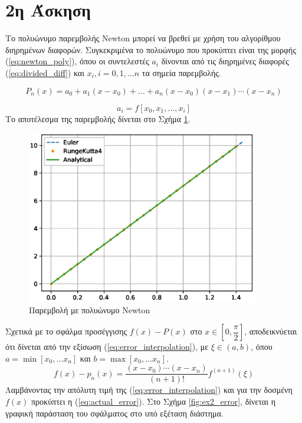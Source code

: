 \documentclass[assignment4.tex]{subfiles}
\begin{document}
\section*{2η Άσκηση}
Το πολυώνυμο παρεμβολής \textlatin{Newton} μπορεί να βρεθεί με χρήση του αλγορίθμου διηρημένων διαφορών. Συγκεκριμένα το πολυώνυμο που προκύπτει είναι της μορφής (\ref{eq:newton_poly}), όπου οι συντελεστές $a_i$ δίνονται από τις διηρημένες διαφορές (\ref{eq:divided_diff}) και $x_i,i=0,1,\dots n$ τα σημεία παρεμβολής. 

\begin{equation}
P_n(x) = a_0 + a_1(x-x_0) + \dots + a_n(x-x_0)(x-x_1)\cdots (x-x_n)
\label{eq:newton_poly}
\end{equation}

\begin{equation}
a_i = f[x_0, x_1, \dots, x_i]
\label{eq:divided_diff}
\end{equation}
Το αποτέλεσμα της παρεμβολής δίνεται στο Σχήμα \ref{fig:ex2}.
\begin{figure}[hp]
	\includegraphics[width=0.9\textwidth]{ex2a.eps}
	\centering
	\caption{Παρεμβολή με πολυώνυμο \textlatin{Newton}}
	\label{fig:ex2}
\end{figure}
Σχετικά με το σφάλμα προσέγγισης $f(x)-P(x)$ στο $x\in[0,\dfrac{\pi}{2}]$, αποδεικνύεται ότι δίνεται από την εξίσωση (\ref{eq:error_interpolation}), με $\xi\in (a, b)$, όπου $a=\min[x_0, \dots x_n]$ και $b=\max[x_0, \dots x_n]$.
\begin{equation}
f(x)-p_n(x)=\frac{(x-x_0)\cdots(x-x_n)}{(n+1)!}f^{(n+1)}(\xi)
\label{eq:error_interpolation}
\end{equation}
Λαμβάνοντας την απόλυτη τιμή της (\ref*{eq:error_interpolation}) και για την δοσμένη $f(x)$ προκύπτει η (\ref{eq:actual_error}). Στο Σχήμα \ref{fig:ex2_error}, δίνεται η γραφική παράσταση του σφάλματος στο υπό εξέταση διάστημα.
\end{document}
